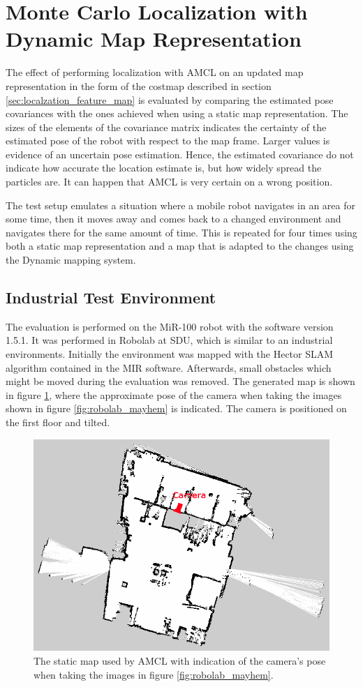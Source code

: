 \section{Monte Carlo Localization with Dynamic Map Representation}
\label{sec:amcl_dyn_map}
The effect of performing localization with AMCL on an updated map representation in the form of the costmap described in section \ref{sec:localzation_feature_map} is evaluated by comparing the estimated pose covariances with the ones achieved when using a static map representation. 
The sizes of the elements of the covariance matrix indicates the certainty of the estimated pose of the robot with respect to the map frame. 
Larger values is evidence of an uncertain pose estimation. Hence, the estimated covariance do not indicate how accurate the location estimate is, but how widely spread the particles are. 
It can happen that AMCL is very certain on a wrong position. 

The test setup emulates a situation where a mobile robot navigates in an area for some time, then it moves away and comes back to a changed environment and navigates there for the same amount of time. 
This is repeated for four times using both a static map representation and a map that is adapted to the changes using the Dynamic mapping system. 

\subsection{Industrial Test Environment}
The evaluation is performed on the MiR-100 robot with the software version 1.5.1. It was performed in Robolab at SDU, which is similar to an industrial environments. Initially the environment was mapped with the Hector SLAM algorithm contained in the MIR software. 
Afterwards, small obstacles which might be moved during the evaluation was removed.
The generated map is shown in figure \ref{fig:Robolab1_clean_with_cam}, where the approximate pose of the camera when taking the images shown in figure \ref{fig:robolab_mayhem} is indicated. 
The camera is positioned on the first floor and tilted.

\begin{figure}[tbph]
	\centering
	\includegraphics[width=0.7\linewidth]{chapters/evaluation/figures/Robolab1_clean_with_cam}
	\caption{The static map used by AMCL with indication of the camera's pose when taking the images in figure \ref{fig:robolab_mayhem}.}
	\label{fig:Robolab1_clean_with_cam}
\end{figure}

